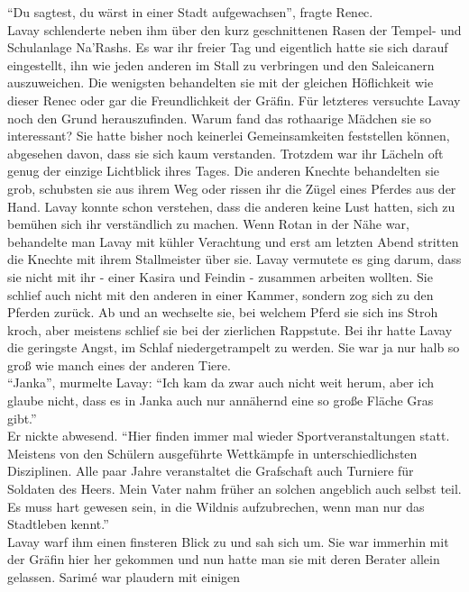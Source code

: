 
``Du sagtest, du wärst in einer Stadt aufgewachsen'', fragte Renec.\\
Lavay schlenderte neben ihm über den kurz geschnittenen Rasen der Tempel- und Schulanlage Na'Rashs. 
Es war ihr freier Tag und eigentlich hatte sie sich darauf eingestellt, ihn wie jeden anderen im 
Stall zu verbringen und den Saleicanern auszuweichen. Die wenigsten behandelten sie mit der 
gleichen Höflichkeit wie dieser Renec oder gar die Freundlichkeit der Gräfin. Für letzteres 
versuchte Lavay noch den Grund herauszufinden. Warum fand das rothaarige Mädchen sie so 
interessant? Sie hatte bisher noch keinerlei Gemeinsamkeiten feststellen können, abgesehen davon, 
dass sie sich kaum verstanden. Trotzdem war ihr Lächeln oft genug der einzige Lichtblick ihres 
Tages. Die anderen Knechte behandelten sie grob, schubsten sie aus ihrem Weg oder rissen ihr die 
Zügel eines Pferdes aus der Hand. Lavay konnte schon verstehen, dass die anderen keine Lust hatten, 
sich zu bemühen sich ihr verständlich zu machen. Wenn Rotan in der Nähe war, behandelte man Lavay 
mit kühler Verachtung und erst am letzten Abend stritten die Knechte mit ihrem Stallmeister über 
sie. Lavay vermutete es ging darum, dass sie nicht mit ihr - einer Kasira und Feindin - zusammen 
arbeiten wollten. Sie schlief auch nicht mit den anderen in einer Kammer, sondern zog sich zu den 
Pferden zurück. Ab und an wechselte sie, bei welchem Pferd sie sich ins Stroh kroch, aber meistens 
schlief sie bei der zierlichen Rappstute. Bei ihr hatte Lavay die geringste Angst, im Schlaf 
niedergetrampelt zu werden. Sie war ja nur halb so groß wie manch eines der anderen Tiere.\\
``Janka'', murmelte Lavay: ``Ich kam da zwar auch nicht weit herum, aber ich glaube nicht, dass es 
in Janka auch nur annähernd eine so große Fläche Gras gibt.''\\
Er nickte abwesend. ``Hier finden immer mal wieder Sportveranstaltungen statt. Meistens von den 
Schülern ausgeführte Wettkämpfe in unterschiedlichsten Disziplinen. Alle paar Jahre veranstaltet 
die Grafschaft auch Turniere für Soldaten des Heers. Mein Vater nahm früher an solchen angeblich 
auch selbst teil. Es muss hart gewesen sein, in die Wildnis aufzubrechen, wenn man nur das 
Stadtleben kennt.''\\
Lavay warf ihm einen finsteren Blick zu und sah sich um. Sie war immerhin mit der Gräfin hier her 
gekommen und nun hatte man sie mit deren Berater allein gelassen. Sarimé war plaudern mit einigen 
